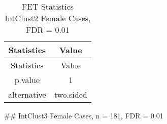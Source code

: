 \documentclass[]{article}
\begin{document}
\begin{longtable}[]{@{}cc@{}}
\caption{FET Statistics IntClust2 Female Cases, FDR =
0.01}\tabularnewline
\toprule
\begin{minipage}[b]{0.18\columnwidth}\centering\strut
Statistics\strut
\end{minipage} & \begin{minipage}[b]{0.14\columnwidth}\centering\strut
Value\strut
\end{minipage}\tabularnewline
\midrule
\endfirsthead
\toprule
\begin{minipage}[b]{0.18\columnwidth}\centering\strut
Statistics\strut
\end{minipage} & \begin{minipage}[b]{0.14\columnwidth}\centering\strut
Value\strut
\end{minipage}\tabularnewline
\midrule
\endhead
\begin{minipage}[t]{0.18\columnwidth}\centering\strut
p.value\strut
\end{minipage} & \begin{minipage}[t]{0.14\columnwidth}\centering\strut
1\strut
\end{minipage}\tabularnewline
\begin{minipage}[t]{0.18\columnwidth}\centering\strut
alternative\strut
\end{minipage} & \begin{minipage}[t]{0.14\columnwidth}\centering\strut
two.sided\strut
\end{minipage}\tabularnewline
\bottomrule
\end{longtable}

\pagebreak
\#\# IntClust3 Female Cases, n = 181, FDR = 0.01
\end{document}
